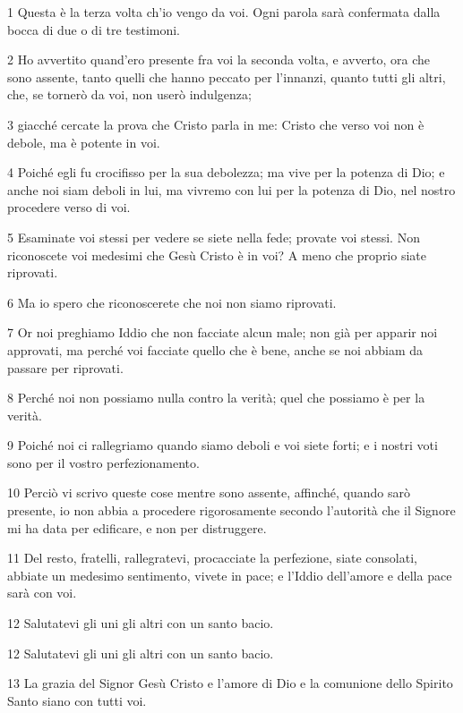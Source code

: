 \par 1 Questa è la terza volta ch'io vengo da voi. Ogni parola sarà confermata dalla bocca di due o di tre testimoni.
\par 2 Ho avvertito quand'ero presente fra voi la seconda volta, e avverto, ora che sono assente, tanto quelli che hanno peccato per l'innanzi, quanto tutti gli altri, che, se tornerò da voi, non userò indulgenza;
\par 3 giacché cercate la prova che Cristo parla in me: Cristo che verso voi non è debole, ma è potente in voi.
\par 4 Poiché egli fu crocifisso per la sua debolezza; ma vive per la potenza di Dio; e anche noi siam deboli in lui, ma vivremo con lui per la potenza di Dio, nel nostro procedere verso di voi.
\par 5 Esaminate voi stessi per vedere se siete nella fede; provate voi stessi. Non riconoscete voi medesimi che Gesù Cristo è in voi? A meno che proprio siate riprovati.
\par 6 Ma io spero che riconoscerete che noi non siamo riprovati.
\par 7 Or noi preghiamo Iddio che non facciate alcun male; non già per apparir noi approvati, ma perché voi facciate quello che è bene, anche se noi abbiam da passare per riprovati.
\par 8 Perché noi non possiamo nulla contro la verità; quel che possiamo è per la verità.
\par 9 Poiché noi ci rallegriamo quando siamo deboli e voi siete forti; e i nostri voti sono per il vostro perfezionamento.
\par 10 Perciò vi scrivo queste cose mentre sono assente, affinché, quando sarò presente, io non abbia a procedere rigorosamente secondo l'autorità che il Signore mi ha data per edificare, e non per distruggere.
\par 11 Del resto, fratelli, rallegratevi, procacciate la perfezione, siate consolati, abbiate un medesimo sentimento, vivete in pace; e l'Iddio dell'amore e della pace sarà con voi.
\par 12 Salutatevi gli uni gli altri con un santo bacio.
\par 12 Salutatevi gli uni gli altri con un santo bacio.
\par 13 La grazia del Signor Gesù Cristo e l'amore di Dio e la comunione dello Spirito Santo siano con tutti voi.


